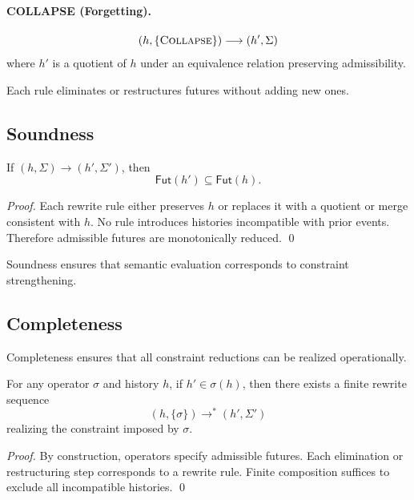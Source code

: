 \documentclass[11pt]{article}
\begin{document}
\paragraph{COLLAPSE (Forgetting).}
\[
(h, \{\textsc{Collapse}\}) \longrightarrow (h', \Sigma)
\]
where $h'$ is a quotient of $h$ under an equivalence relation preserving
admissibility.

Each rule eliminates or restructures futures without adding new ones.

\subsection{Soundness}

\begin{theorem}[Soundness]
If $(h, \Sigma) \longrightarrow (h', \Sigma')$, then
\[
\mathsf{Fut}(h') \subseteq \mathsf{Fut}(h).
\]
\end{theorem}

\begin{proof}
Each rewrite rule either preserves $h$ or replaces it with a quotient or merge
consistent with $h$. No rule introduces histories incompatible with prior events.
Therefore admissible futures are monotonically reduced. \qed
\end{proof}

Soundness ensures that semantic evaluation corresponds to constraint
strengthening.

\subsection{Completeness}

Completeness ensures that all constraint reductions can be realized operationally.

\begin{theorem}[Completeness]
For any operator $\sigma$ and history $h$, if $h' \in \sigma(h)$, then there exists
a finite rewrite sequence
\[
(h, \{\sigma\}) \longrightarrow^{*} (h', \Sigma')
\]
realizing the constraint imposed by $\sigma$.
\end{theorem}

\begin{proof}
By construction, operators specify admissible futures. Each elimination or
restructuring step corresponds to a rewrite rule. Finite composition suffices to
exclude all incompatible histories. \qed
\end{proof}
\end{document}
